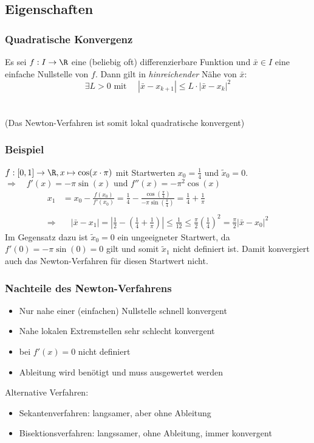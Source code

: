 \subsection{Eigenschaften}
%
\begin{frame}\frametitle{Quadratische Konvergenz}
Es sei $f:I \to \R$ eine (beliebig oft) differenzierbare Funktion und $\bar x \in I$ eine einfache Nullstelle von $f$. Dann gilt in \textit{hinreichender} Nähe von $\bar x$:
$$
\exists L >0 \text{ mit } \quad |\bar x - x_{k+1}|\le L \cdot |\bar x - x_k|^2
$$ 
\quad\\\quad\\
(Das Newton-Verfahren ist somit lokal quadratische konvergent)
\end{frame}
%
%
\begin{frame}\frametitle{Beispiel}
$f: [0,1] \to \R, x \mapsto \cos(x\cdot \pi)$ mit Startwerten $x_0=\frac{1}{4}$ und $\tilde x_0=0$.\\\pause
$\Rightarrow \quad f'(x)=-\pi\sin(x) \text{ und } f''(x)=-\pi^2\cos(x)$\pause
\begin{align*}
x_1&=x_0-\frac{f(x_0)}{f'(x_0)}=\frac{1}{4}-\frac{\cos(\frac{\pi}{4})}{-\pi\sin(\frac{\pi}{4})}=\frac{1}{4}+\frac{1}{\pi}\\
&\\
\Rightarrow&\quad |\bar x - x_1|=\left|\frac{1}{2}-(\frac{1}{4}+\frac{1}{\pi})\right|\le \frac{1}{12}\le  \frac{\pi}{2}(\frac{1}{4})^2=\frac{\pi}{2}|\bar x - x_0|^2
\end{align*}\pause
Im Gegensatz dazu ist $\tilde x_0=0$ ein ungeeigneter Startwert, da $f'(0)=-\pi \sin(0)=0$ gilt und somit $\tilde x_1$ nicht definiert ist. Damit konvergiert auch das Newton-Verfahren für diesen Startwert nicht.
\end{frame}
%
\begin{frame}\frametitle{Nachteile des Newton-Verfahrens}
\begin{itemize}
\item Nur nahe einer (einfachen) Nullstelle schnell konvergent
\item Nahe lokalen Extremstellen sehr schlecht konvergent
\item bei $f'(x)=0$ nicht definiert
\item Ableitung wird benötigt und muss ausgewertet werden
\end{itemize}\pause
\vfill
Alternative Verfahren:
\begin{itemize}
\item Sekantenverfahren: langsamer, aber ohne Ableitung
\item Bisektionsverfahren: langssamer, ohne Ableitung, immer konvergent
\end{itemize}
\end{frame}
%
